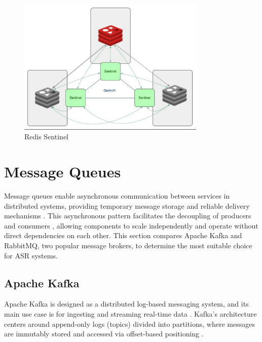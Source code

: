 \begin{figure}[H]
    \centering
    \includegraphics[width=0.8\textwidth]{figures/redis_sentinel.png}
    \caption{Redis Sentinel}
    \label{fig:redis_sentinel}
\end{figure}

\section{Message Queues}
Message queues enable asynchronous communication between services in distributed systems, providing temporary message storage and reliable delivery mechanisms \cite{queue_definition}. This asynchronous pattern facilitates the decoupling of producers and consumers \cite{queue_decouple}, allowing components to scale independently and operate without direct dependencies on each other. This section compares Apache Kafka and RabbitMQ, two popular message brokers, to determine the most suitable choice for ASR systems.
\subsection{Apache Kafka}
Apache Kafka is designed as a distributed log-based messaging system, and its main use case is for ingesting and streaming real-time data \cite{kafka_definition}. Kafka's architecture centers around append-only logs (topics) divided into partitions, where messages are immutably stored and accessed via offset-based positioning \cite{kafka_documentation}.

